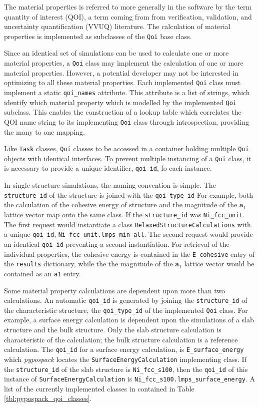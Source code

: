 The material properties is referred to more generally in the software by the term quantity of interest (QOI), a term coming from  from verification, validation, and uncertainty quantification (VVUQ) literature.
The calculation of material properties is implemented as subclasses of the \verb|Qoi| base class.

Since an identical set of simulations can be used to calculate one or more material properties, a \verb|Qoi| class may implement the calculation of one or more material properties.  However, a potential developer may not be interested in optimizing to all these material properties.  Each implemented \verb|Qoi| class must implement a static \verb|qoi_names| attribute.  This attribute is a list of strings, which identify which material property which is modelled by the implemented \verb|Qoi| subclass.  This enables the construction of a lookup table which correlates the QOI name string to its implementing \verb|Qoi| class through introspection, providing the many to one mapping.

Like \verb|Task| classes, \verb|Qoi| classes to be accessed in a container holding multiple \verb|Qoi| objects with identical interfaces.  To prevent multiple instancing of a \verb|Qoi| class, it is necessary to provide a unique identifier, \verb|qoi_id|, fo each instance.

In single structure simulations, the naming convention is simple.  The \verb|structure_id| of the structure is joined with the \verb|qoi_type_id|  For example, both the calculation of the cohesive energy of structure  and the magnitude of the $\bm{a}_1$ lattice vector map onto the same class.  If the \verb|structure_id| was \verb|Ni_fcc_unit|.  The first request would instantiate a class \verb|RelaxedStructureCalculations| with a unique \verb|qoi_id|, \verb|Ni_fcc_unit.lmps_min_all|.  The second request would provide an identical \verb|qoi_id| preventing a second instantiation.  For retrieval of the individual properties, the cohesive energy is contained in the \verb|E_cohesive| entry of the \verb|results| dictionary, while the the magnitude of the $\bm{a}_1$ lattice vector would be contained as an \verb|a1| entry.

Some material property calculations are dependent upon more than two calculations.  An automatic \verb|qoi_id| is generated by joining the \verb|structure_id| of the characteristic structure, the \verb|qoi_type_id| of the implemented \verb|Qoi| class.  For example, a surface energy calculation is dependent upon the simulations of a slab structure and the bulk structure.  Only the slab structure calculation is characteristic of the calculation; the bulk structure calculation is a reference calculation.  The \verb|qoi_id| for a surface energy calculation, is \verb|E_surface_energy| which \emph{pypospack} locates the \verb|SurfaceEnergyCalculation| implementing class.  If the \verb|structure_id| of the slab structure is \verb|Ni_fcc_s100|, then the \verb|qoi_id| of this instance of \verb|SurfaceEnergyCalculation| is \verb|Ni_fcc_s100.lmps_surface_energy|.  A list of the currently implemented classes in contained in Table \ref{tbl:pypospack_qoi_classes}.

